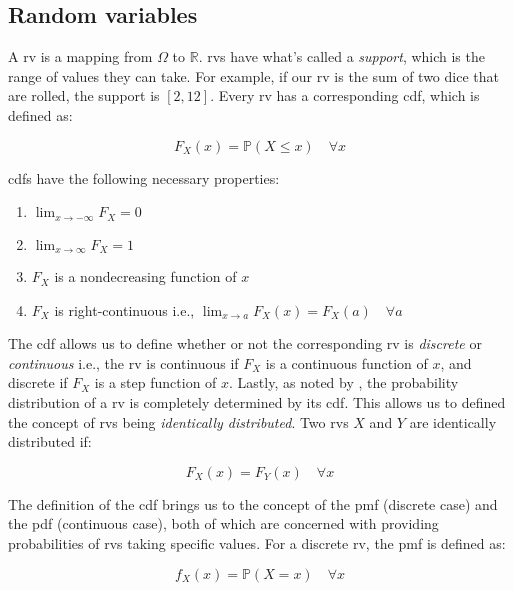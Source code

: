 \documentclass{report}
\begin{document}
\subsection{Random variables}

A \gls{rv} is a mapping from $\Omega$ to $\mathbb{R}$. \glspl{rv} have what's called a \textit{support}, which is the range of values they can take. For example, if our \gls{rv} is the sum of two dice that are rolled, the support is $[2, 12]$.  Every \gls{rv} has a corresponding \gls{cdf}, which is defined as:

\begin{equation}\label{eq:cdf}
    F_X(x) = \mathbb{P}(X \leq x) \quad \forall x
\end{equation}

\Glspl{cdf} have the following necessary properties:

\begin{enumerate}
    \item $\lim_{x \to -\infty} F_X = 0$
    \item $\lim_{x \to \infty} F_X = 1$
    \item $F_X$ is a nondecreasing function of $x$ 
    \item $F_X$ is right-continuous i.e., $\lim_{x \to a} F_X(x) = F_X(a) \quad \forall a$
\end{enumerate}

The \gls{cdf} allows us to define whether or not the corresponding \gls{rv} is \textit{discrete} or \textit{continuous} i.e., the \gls{rv} is continuous if $F_X$ is a continuous function of $x$, and discrete if $F_X$ is a step function of $x$. Lastly, as noted by \cite[Chapter~1.5]{casella_statistical_2002}, the probability distribution of a \gls{rv} is completely determined by its \gls{cdf}. This allows us to defined the concept of \glspl{rv} being \textit{identically distributed}. Two \glspl{rv} $X$ and $Y$ are identically distributed if:

\begin{equation}\label{eq:identically-distributed}
    F_X(x) = F_Y(x) \quad \forall x
\end{equation}

The definition of the \gls{cdf} brings us to the concept of the \gls{pmf} (discrete case) and the \gls{pdf} (continuous case), both of which are concerned with providing probabilities of \glspl{rv} taking specific values. For a discrete \gls{rv}, the \gls{pmf} is defined as:

\begin{equation}\label{eq:pmf}
    f_X(x) = \mathbb{P}(X = x) \quad \forall x
\end{equation}
\end{document}
